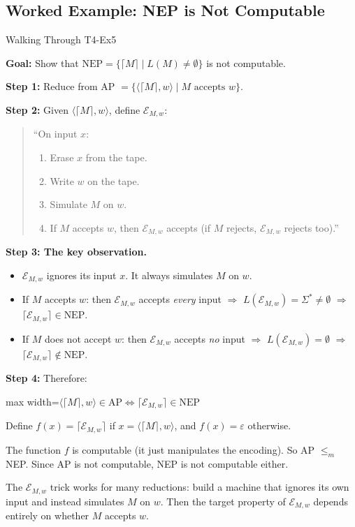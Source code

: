 \documentclass[11pt,a4paper]{article}
\newcommand{\fitmath}[1]{\begin{adjustbox}{max width=\linewidth}$\displaystyle #1$\end{adjustbox}}
\newcommand{\keytakeaway}[1]{%
  \par\vspace{0.3em}%
  \colorbox{yellow!60}{\parbox{\dimexpr\linewidth-2\fboxsep}{#1}}%
  \vspace{0.3em}}
\begin{document}
\subsection{Worked Example: NEP is Not Computable}

\begin{examplebox}{Walking Through T4-Ex5}

\textbf{Goal:} Show that $\text{NEP} = \{\lceil M \rceil \mid L(M) \neq \emptyset\}$ is not computable.

\textbf{Step 1:} Reduce from AP $= \{\langle \lceil M \rceil, w \rangle \mid M \text{ accepts } w\}$.

\textbf{Step 2:} Given $\langle \lceil M \rceil, w \rangle$, define $\mathcal{E}_{M,w}$:

\begin{quote}
``On input $x$:
\begin{enumerate}
    \item Erase $x$ from the tape.
    \item Write $w$ on the tape.
    \item Simulate $M$ on $w$.
    \item If $M$ accepts $w$, then $\mathcal{E}_{M,w}$ accepts (if $M$ rejects, $\mathcal{E}_{M,w}$ rejects too).''
\end{enumerate}
\end{quote}

\textbf{Step 3: The key observation.}
\begin{itemize}
    \item $\mathcal{E}_{M,w}$ ignores its input $x$. It always simulates $M$ on $w$.
    \item If $M$ accepts $w$: then $\mathcal{E}_{M,w}$ accepts \emph{every} input $\Rightarrow$ $L(\mathcal{E}_{M,w}) = \Sigma^* \neq \emptyset$ $\Rightarrow$ $\lceil \mathcal{E}_{M,w} \rceil \in \text{NEP}$.
    \item If $M$ does not accept $w$: then $\mathcal{E}_{M,w}$ accepts \emph{no} input $\Rightarrow$ $L(\mathcal{E}_{M,w}) = \emptyset$ $\Rightarrow$ $\lceil \mathcal{E}_{M,w} \rceil \notin \text{NEP}$.
\end{itemize}

\textbf{Step 4:} Therefore:
\fitmath{\langle \lceil M \rceil, w \rangle \in \text{AP} \iff \lceil \mathcal{E}_{M,w} \rceil \in \text{NEP}}

Define $f(x) = \lceil \mathcal{E}_{M,w} \rceil$ if $x = \langle \lceil M \rceil, w \rangle$, and $f(x) = \varepsilon$ otherwise.

The function $f$ is computable (it just manipulates the encoding). So AP $\leq_m$ NEP. Since AP is not computable, NEP is not computable either.

\keytakeaway{The $\mathcal{E}_{M,w}$ trick works for many reductions: build a machine that ignores its own input and instead simulates $M$ on $w$. Then the target property of $\mathcal{E}_{M,w}$ depends entirely on whether $M$ accepts $w$.}
\end{examplebox}
\end{document}
